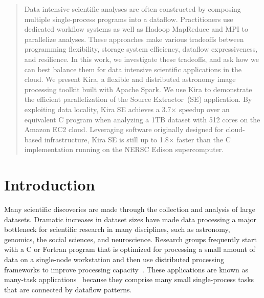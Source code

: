 \documentclass[10pt, conference, compsocconf]{IEEEtran}
\begin{document}
\maketitle

\begin{abstract}
Data intensive scientific analyses are often constructed by composing multiple single-process programs into a \linebreak dataflow.
Practitioners use dedicated workflow systems as well as Hadoop MapReduce and MPI to parallelize analyses.
These approaches make various tradeoffs between programming flexibility, storage system efficiency, dataflow expressiveness,
and resilience. In this work, we investigate these tradeoffs, and ask how we can best balance them
for data intensive scientific applications in the cloud. We present Kira, a flexible and distributed astronomy
image processing toolkit built with Apache Spark. 
We use Kira to demonstrate the efficient parallelization of the Source Extractor~(SE) application. 
By exploiting data locality, Kira SE achieves a 3.7$\times$ speedup over an equivalent C program when analyzing a 1TB
dataset with 512 cores on the Amazon EC2 cloud. 
Leveraging software originally designed for cloud-based infrastructure, Kira SE is still up to 1.8$\times$ faster than the C implementation
running on the NERSC Edison supercomputer.


\end{abstract}



\section{Introduction}
Many scientific discoveries are made through the collection and analysis of large datasets.
Dramatic increases in dataset sizes have made data processing a major bottleneck for scientific research in many disciplines, such as astronomy, genomics, the social sciences, and neuroscience.
Research groups frequently start with a C or Fortran program that is optimized for processing a small amount of data on a single-node workstation and then use distributed processing frameworks to improve processing capacity~\cite{jacob09, altschul90}.
These applications are known as many-task applications~\cite{raicu08} because they comprise many small single-process tasks that are connected by dataflow patterns.
\end{document}
